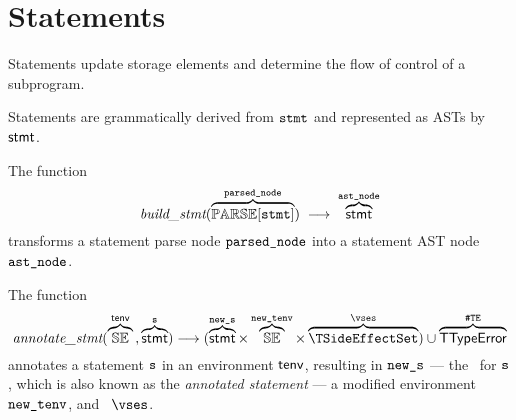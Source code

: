 
\renewcommand\hyperlink[2]{#2}
\renewcommand\color[1]{}
\renewcommand\xlongrightarrow[1]{\xrightarrow{\qquad#1\qquad}}
\newenvironment{mathpar}{\begin{displaymath}\begin{prooftree}}{\end{prooftree}\end{displaymath}}
\renewcommand\inferrule[2]{\AxiomC{$\displaylines{#1}$}\UnaryInfC{$\displaylines{#2}$}}
\renewcommand\and[0]{}
\newenvironment{flalign}{\begin{align}}{\end{align}}
\newenvironment{flalign*}{\begin{align*}}{\end{align*}}
\chapter{Statements\label{chap:Statements}}
Statements update storage elements and determine the flow of control of a subprogram.

Statements are grammatically derived from $\Nstmt$ and represented as ASTs by $\stmt$.

\hypertarget{build-stmt}{}
The function
\[
\buildstmt(\overname{\parsenode{\Nstmt}}{\vparsednode}) \;\aslto\; \overname{\stmt}{\vastnode}
\]
transforms a statement parse node $\texttt{parsed\_node}$ into a statement AST node $\texttt{ast\_node}$.

\hypertarget{def-annotatestmt}{}
The function
\[
  \annotatestmt(\overname{\staticenvs}{\tenv} \aslsep \overname{\stmt}{\vs}) \aslto
  (\overname{\stmt}{\news} \times \overname{\staticenvs}{\newtenv} \times \overname{\TSideEffectSet}{\vses})
  \cup \overname{\TTypeError}{\TypeErrorConfig}
\]
annotates a statement $\texttt{s}$ in an environment $\textsf{tenv}$, resulting in $\texttt{new\_s}$ ---
the \typedast\ for $\texttt{s}$, which is also known as the \emph{annotated statement} ---
a modified environment $\texttt{new\_tenv}$, and \sideeffectsetterm\ $\vses$. \ProseOtherwiseTypeError

